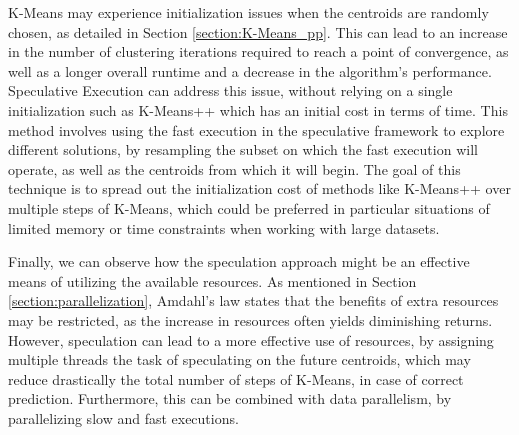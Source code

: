 K-Means may experience initialization issues when the centroids are randomly chosen, as detailed in Section \ref{section:K-Means_pp}. This can lead to an increase in the number of clustering iterations required to reach a point of convergence, as well as a longer overall runtime and a decrease in the algorithm's performance. Speculative Execution can address this issue, without relying on a single initialization such as K-Means++ which has an initial cost in terms of time. This method involves using the fast execution in the speculative framework to explore different solutions, by resampling the subset on which the fast execution will operate, as well as the centroids from which it will begin. The goal of this technique is to spread out the initialization cost of methods like K-Means++ over multiple steps of K-Means, which could be preferred in particular situations of limited memory or time constraints when working with large datasets.

Finally, we can observe how the speculation approach might be an effective means of utilizing the available resources. As mentioned in Section \ref{section:parallelization}, Amdahl's law states that the benefits of extra resources may be restricted, as the increase in resources often yields diminishing returns. However, speculation can lead to a more effective use of resources, by assigning multiple threads the task of speculating on the future centroids, which may reduce drastically the total number of steps of K-Means, in case of correct prediction. Furthermore, this can be combined with data parallelism, by parallelizing slow and fast executions.